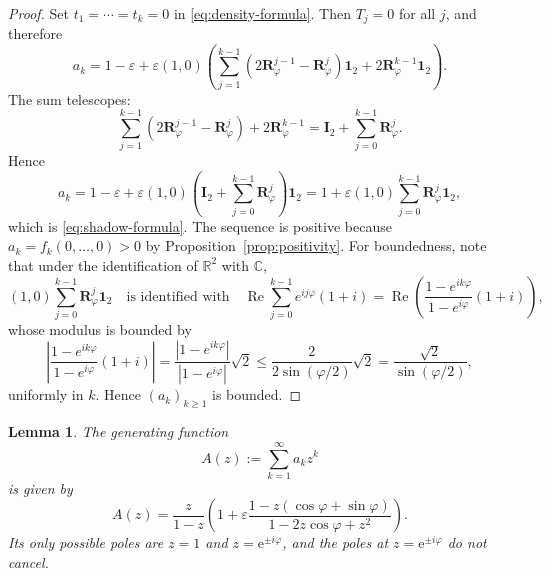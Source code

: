 \documentclass[11pt]{article}
\newtheorem{lemma}[theorem]{Lemma}
\theoremstyle{definition}
\theoremstyle{remark}
\newcommand{\e}{\mathrm{e}}
\begin{document}
\begin{proof}
Set \(t_1=\cdots=t_k=0\) in \eqref{eq:density-formula}. Then \(T_j=0\) for all \(j\), and therefore
\[
a_k
=
1-\varepsilon
+
\varepsilon(1,0)\left(
\sum_{j=1}^{k-1}(2\bm{R}_\varphi^{j-1}-\bm{R}_\varphi^j)\bm{1}_2
+
2\bm{R}_\varphi^{k-1}\bm{1}_2
\right).
\]
The sum telescopes:
\[
\sum_{j=1}^{k-1}(2\bm{R}_\varphi^{j-1}-\bm{R}_\varphi^j)+2\bm{R}_\varphi^{k-1}
=
\bm{I}_2+\sum_{j=0}^{k-1}\bm{R}_\varphi^j.
\]
Hence
\[
a_k
=
1-\varepsilon
+
\varepsilon(1,0)\left(\bm{I}_2+\sum_{j=0}^{k-1}\bm{R}_\varphi^j\right)\bm{1}_2
=
1+\varepsilon(1,0)\sum_{j=0}^{k-1}\bm{R}_\varphi^j\bm{1}_2,
\]
which is \eqref{eq:shadow-formula}. The sequence is positive because $a_k = f_k(0,\dots,0) > 0$ by Proposition~\ref{prop:positivity}. For boundedness, note that under the identification of $\mathbb{R}^2$ with $\mathbb{C}$,
\[
(1,0)\sum_{j=0}^{k-1}\bm{R}_\varphi^j\bm{1}_2
\quad\mbox{is identified with}\quad
\operatorname{Re}\sum_{j=0}^{k-1}e^{ij\varphi}(1+i)
=
\operatorname{Re}\left(\frac{1-e^{ik\varphi}}{1-e^{i\varphi}}(1+i)\right),
\]
whose modulus is bounded by
\[
\left|\frac{1-e^{ik\varphi}}{1-e^{i\varphi}}(1+i)\right|
=
\frac{|1-e^{ik\varphi}|}{|1-e^{i\varphi}|}\sqrt{2}
\le
\frac{2}{2\sin(\varphi/2)}\sqrt{2}
=
\frac{\sqrt{2}}{\sin(\varphi/2)},
\]
uniformly in $k$. Hence $(a_k)_{k\ge 1}$ is bounded.
\end{proof}

\begin{lemma}\label{lem:gf}
The generating function
\[
A(z):=\sum_{k=1}^{\infty} a_k z^k
\]
is given by
\begin{equation}\label{eq:gf-explicit}
A(z)
=
\frac{z}{1-z}
\left(
1+\varepsilon\frac{1-z(\cos\varphi+\sin\varphi)}{1-2z\cos\varphi+z^2}
\right).
\end{equation}
Its only possible poles are $z=1$ and $z=\e^{\pm i\varphi}$, and the poles at $z=\e^{\pm i\varphi}$ do not cancel.
\end{lemma}
\end{document}
